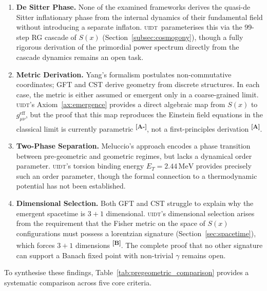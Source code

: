 \documentclass[12pt,a4paper,twoside]{article}
\theoremstyle{plain}
\theoremstyle{definition}
\theoremstyle{remark}
\newcommand{\UIDT}{\textsc{uidt}}
\newcommand{\MeV}{\,\mathrm{MeV}}
\newcommand{\catmark}[1]{\textsuperscript{\textsf{\textbf{[#1]}}}}
\newcommand{\ETorsion}{2.44\MeV}                    %
\begin{document}
\begin{enumerate}
  \item \textbf{De Sitter Phase.} None of the examined frameworks derives the
    quasi-de Sitter inflationary phase from the internal dynamics of
    their fundamental field without introducing a separate inflaton. \UIDT\
    parameterises this via the 99-step RG cascade of $S(x)$ (Section~\ref{subsec:cosmogony}),
    though a fully rigorous derivation of the primordial power spectrum
    directly from the cascade dynamics remains an open task.
  \item \textbf{Metric Derivation.} Yang's formalism postulates non-commutative
    coordinates; GFT and CST derive geometry from discrete structures. In each
    case, the metric is either assumed or emergent only in a coarse-grained
    limit. \UIDT's Axiom~\ref{ax:emergence} provides a direct algebraic map
    from $S(x)$ to $g_{\mu\nu}^{\mathrm{eff}}$, but the proof that this map
    reproduces the Einstein field equations in the classical limit
    is currently parametric \catmark{A-}, not a first-principles derivation
    \catmark{A}.
  \item \textbf{Two-Phase Separation.} Meluccio's approach encodes a phase
    transition between pre-geometric and geometric regimes, but lacks a
    dynamical order parameter. \UIDT's torsion binding energy $E_T = \ETorsion$
    provides precisely such an order parameter, though the formal connection
    to a thermodynamic potential has not been established.
  \item \textbf{Dimensional Selection.} Both GFT and CST struggle to explain
    why the emergent spacetime is $3+1$ dimensional. \UIDT's dimensional
    selection arises from the requirement that the Fisher metric on the space
    of $S(x)$ configurations must possess a lorentzian signature
    (Section~\ref{sec:spacetime}), which forces $3+1$ dimensions
    \catmark{B}. The complete proof that no other signature can support a
    Banach fixed point with non-trivial $\gamma$ remains open.
\end{enumerate}

To synthesise these findings, Table~\ref{tab:pregeometric_comparison} provides a systematic comparison across five core criteria.
\end{document}
